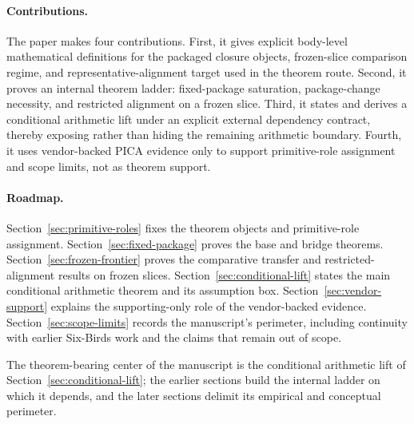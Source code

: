 \documentclass[11pt]{article}
\begin{document}
\paragraph{Contributions.}
The paper makes four contributions. First, it gives explicit body-level
mathematical definitions for the packaged closure objects, frozen-slice
comparison regime, and representative-alignment target used in the theorem route.
Second, it proves an internal theorem ladder: fixed-package saturation,
package-change necessity, and restricted alignment on a frozen slice. Third, it
states and derives a conditional arithmetic lift under an explicit external
dependency contract, thereby exposing rather than hiding the remaining arithmetic
boundary. Fourth, it uses vendor-backed PICA evidence only to support
primitive-role assignment and scope limits, not as theorem support.

\paragraph{Roadmap.}
Section~\ref{sec:primitive-roles} fixes the theorem objects and primitive-role
assignment. Section~\ref{sec:fixed-package} proves the base and bridge theorems.
Section~\ref{sec:frozen-frontier} proves the comparative transfer and
restricted-alignment results on frozen slices. Section~\ref{sec:conditional-lift}
states the main conditional arithmetic theorem and its assumption box.
Section~\ref{sec:vendor-support} explains the supporting-only role of the
vendor-backed evidence. Section~\ref{sec:scope-limits} records the manuscript's
perimeter, including continuity with earlier Six-Birds work and the claims that
remain out of scope.

The theorem-bearing center of the manuscript is the conditional arithmetic lift of Section~\ref{sec:conditional-lift}; the earlier sections build the internal ladder on which it depends, and the later sections delimit its empirical and conceptual perimeter.
\end{document}
